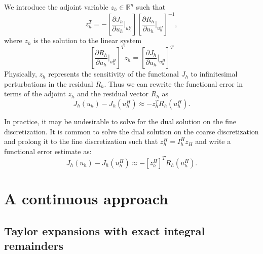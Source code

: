 \documentclass{article}
\begin{document}
We introduce the adjoint variable $z_h \in \mathbb{R}^n$ such that
%
\begin{equation}
z_h^T = 
-\left[ \frac{\partial J_h}{\partial u_h} \biggr|_{u_h^H} \right]
\left[ \frac{\partial R_h}{\partial u_h} \biggr|_{u_h^H} \right]^{-1},
\end{equation}
%
where $z_h$ is the solution to the linear system
%
\begin{equation}
\left[ \frac{\partial R_h}{\partial u_h} \biggr|_{u_h^H} \right]^T
z_h = 
\left[ \frac{\partial J_h}{\partial u_h} \biggr|_{u_h^H} \right]^T
\end{equation}
%
Physically, $z_h$ represents the sensitivity of the functional
$J_h$ to infinitesimal perturbations in the residual $R_h$.
Thus we can rewrite the functional error in terms of the
adjoint $z_h$ and the residual vector $R_h$ as
%
\begin{equation}
J_h(u_h) - J_h(u_h^H) \approx -z_h^T R_h(u_h^H).
\end{equation}

In practice, it may be undesirable to solve for the
dual solution on the fine discretization. It is common to
solve the dual solution on the coarse discretization and
prolong it to the fine discretization such that
$z_h^H = I_h^H z_H$ and write a functional error estimate as:
%
\begin{equation}
J_h(u_h) - J_h(u_h^H) \approx - \left[z_h^H \right]^T R_h(u_h^H).
\end{equation}

\section{A continuous approach}

\subsection{Taylor expansions with exact integral remainders}
\end{document}

